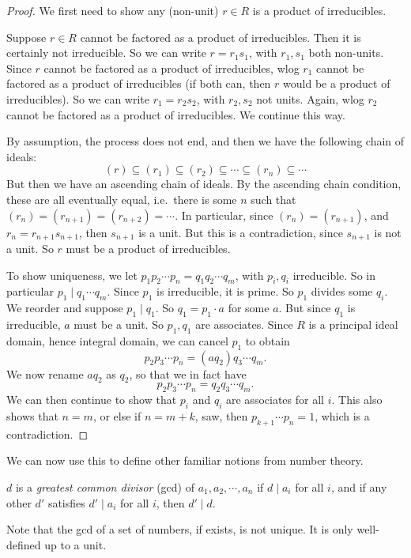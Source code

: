 \documentclass[a4paper]{article}
\begin{document}
\begin{proof}
  We first need to show any (non-unit) $r \in R$ is a product of irreducibles.

  Suppose $r \in R$ cannot be factored as a product of irreducibles. Then it is certainly not irreducible. So we can write $r = r_1 s_1$, with $r_1, s_1$ both non-units. Since $r$ cannot be factored as a product of irreducibles, wlog $r_1$ cannot be factored as a product of irreducibles (if both can, then $r$ would be a product of irreducibles). So we can write $r_1 = r_2 s_2$, with $r_2, s_2$ not units. Again, wlog $r_2$ cannot be factored as a product of irreducibles. We continue this way.

  By assumption, the process does not end, and then we have the following chain of ideals:
  \[
    (r) \subseteq (r_1) \subseteq (r_2) \subseteq \cdots \subseteq (r_n) \subseteq \cdots
  \]
  But then we have an ascending chain of ideals. By the ascending chain condition, these are all eventually equal, i.e.\ there is some $n$ such that $(r_n) = (r_{n + 1}) = (r_{n + 2}) =\cdots$. In particular, since $(r_n) = (r_{n + 1})$, and $r_n = r_{n + 1} s_{n + 1}$, then $s_{n + 1}$ is a unit. But this is a contradiction, since $s_{n + 1}$ is not a unit. So $r$ must be a product of irreducibles.

  To show uniqueness, we let $p_1p_2 \cdots p_n= q_1 q_2 \cdots q_m$, with $p_i, q_i$ irreducible. So in particular $p_1 \mid q_1 \cdots q_m$. Since $p_1$ is irreducible, it is prime. So $p_1$ divides some $q_i$. We reorder and suppose $p_1 \mid q_1$. So $q_1 = p_1 \cdot a$ for some $a$. But since $q_1$ is irreducible, $a$ must be a unit. So $p_1, q_1$ are associates. Since $R$ is a principal ideal domain, hence integral domain, we can cancel $p_1$ to obtain
  \[
    p_2p_3 \cdots p_n = (a q_2) q_3 \cdots q_m.
  \]
  We now rename $aq_2$ as $q_2$, so that we in fact have
  \[
    p_2p_3 \cdots p_n = q_2 q_3 \cdots q_m.
  \]
  We can then continue to show that $p_i$ and $q_i$ are associates for all $i$. This also shows that $n = m$, or else if $n = m + k$, saw, then $p_{k + 1} \cdots p_n = 1$, which is a contradiction.
\end{proof}

We can now use this to define other familiar notions from number theory.
\begin{defi}
  $d$ is a \emph{greatest common divisor} (gcd) of $a_1,a_2, \cdots, a_n$ if $d \mid a_i$ for all $i$, and if any other $d'$ satisfies $d' \mid a_i$ for all $i$, then $d' \mid d$.
\end{defi}
Note that the gcd of a set of numbers, if exists, is not unique. It is only well-defined up to a unit.
\end{document}

